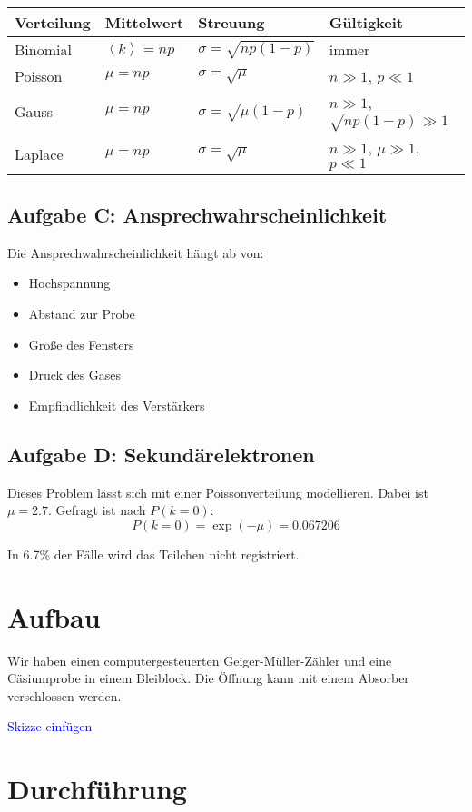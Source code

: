 \documentclass[11pt]{article}
\begin{document}
\begin{tabular}{l|lll}
	Verteilung & Mittelwert & Streuung & Gültigkeit \\
	\hline
	Binomial & $\left\langle k \right\rangle = np$ & $\sigma = \sqrt{n p (1-p)}$ & immer \\
	 Poisson & $\mu = np$ & $\sigma = \sqrt{\mu}$ & $n \gg 1$, $p \ll 1$ \\
		  Gauss & $\mu = np$ & $\sigma = \sqrt{\mu(1-p)}$ & $n \gg 1$, $\sqrt{np(1-p)} \gg 1$ \\
	 Laplace & $\mu = np$ & $\sigma = \sqrt{\mu}$ & $n \gg 1$, $\mu \gg 1$, $p \ll 1$ \\
\end{tabular}

\subsection{Aufgabe C: Ansprechwahrscheinlichkeit}

Die Ansprechwahrscheinlichkeit hängt ab von:
%
\begin{itemize}
	\item Hochspannung
	\item Abstand zur Probe
	\item Größe des Fensters
	\item Druck des Gases
	\item Empfindlichkeit des Verstärkers
\end{itemize}

\subsection{Aufgabe D: Sekundärelektronen}

Dieses Problem lässt sich mit einer Poissonverteilung modellieren. Dabei ist $\mu = 2.7$. Gefragt ist nach $P(k=0)$:
\[ P(k = 0) = \exp(-\mu) = 0.067206 \]

In 6.7\% der Fälle wird das Teilchen nicht registriert.

\section{Aufbau}

Wir haben einen computergesteuerten Geiger-Müller-Zähler und eine Cäsiumprobe in einem Bleiblock. Die Öffnung kann mit einem Absorber verschlossen werden.

\textcolor{blue}{Skizze einfügen}

\section{Durchführung}
\end{document}
